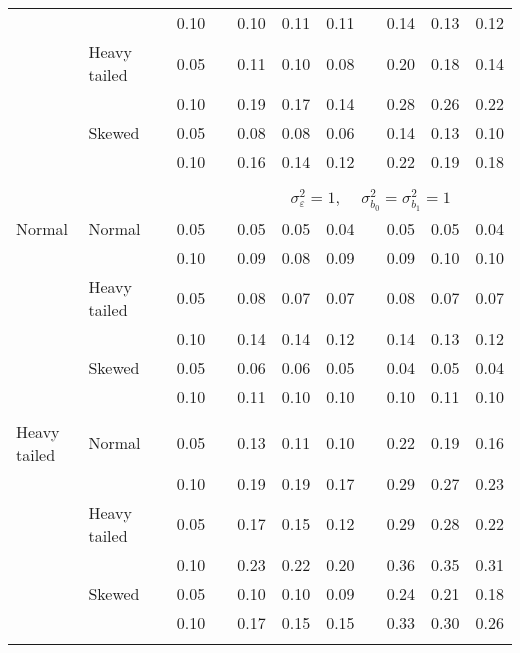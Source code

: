 \begin{table}[ht]
\begin{scriptsize}
\begin{tabular}{ll p{.1cm} c p{.1cm} rrr p{.1cm} rrr}
             &              && 0.10 &&  0.10 & 0.11 & 0.11 && 0.14 & 0.13 & 0.12 \\ 
             & Heavy tailed && 0.05 &&  0.11 & 0.10 & 0.08 && 0.20 & 0.18 & 0.14 \\ 
             &              && 0.10 &&  0.19 & 0.17 & 0.14 && 0.28 & 0.26 & 0.22 \\ 
             & Skewed       && 0.05 &&  0.08 & 0.08 & 0.06 && 0.14 & 0.13 & 0.10 \\ 
             &              && 0.10 &&  0.16 & 0.14 & 0.12 && 0.22 & 0.19 & 0.18 \\ 

&&&&&&&&&&&\\
& && && \multicolumn{7}{c}{$\sigma_{\varepsilon}^2 = 1$, \ \ $\sigma_{b_0}^2 = \sigma_{b_1}^2 = 1$} \\ \cline{6-12}
\rowcolor{gray!20}Normal       & Normal       && 0.05 &&  0.05 & 0.05 & 0.04 && 0.05 & 0.05 & 0.04 \\ 
\rowcolor{gray!20}             &              && 0.10 &&  0.09 & 0.08 & 0.09 && 0.09 & 0.10 & 0.10 \\ 
\rowcolor{gray!20}             & Heavy tailed && 0.05 &&  0.08 & 0.07 & 0.07 && 0.08 & 0.07 & 0.07 \\ 
\rowcolor{gray!20}             &              && 0.10 &&  0.14 & 0.14 & 0.12 && 0.14 & 0.13 & 0.12 \\ 
\rowcolor{gray!20}             & Skewed       && 0.05 &&  0.06 & 0.06 & 0.05 && 0.04 & 0.05 & 0.04 \\ 
\rowcolor{gray!20}             &              && 0.10 &&  0.11 & 0.10 & 0.10 && 0.10 & 0.11 & 0.10 \\ 
             &&&&&&&&&&&\\
Heavy tailed & Normal       && 0.05 &&  0.13 & 0.11 & 0.10 && 0.22 & 0.19 & 0.16 \\ 
             &              && 0.10 &&  0.19 & 0.19 & 0.17 && 0.29 & 0.27 & 0.23 \\ 
             & Heavy tailed && 0.05 &&  0.17 & 0.15 & 0.12 && 0.29 & 0.28 & 0.22 \\ 
             &              && 0.10 &&  0.23 & 0.22 & 0.20 && 0.36 & 0.35 & 0.31 \\ 
             & Skewed       && 0.05 &&  0.10 & 0.10 & 0.09 && 0.24 & 0.21 & 0.18 \\ 
             &              && 0.10 &&  0.17 & 0.15 & 0.15 && 0.33 & 0.30 & 0.26 \\ 
             &&&&&&&&&&&\\

\end{tabular}
\end{scriptsize}
\end{table}
